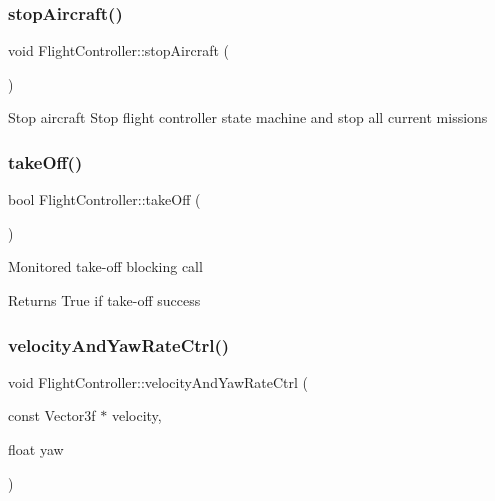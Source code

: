 \subsubsection{\texorpdfstring{stop\+Aircraft()}{stopAircraft()}}
{\footnotesize\ttfamily void Flight\+Controller\+::stop\+Aircraft (\begin{DoxyParamCaption}{ }\end{DoxyParamCaption})}

Stop aircraft Stop flight controller state machine and stop all current missions \mbox{\label{class_m210_1_1_flight_controller_a543d0eeef65856bf15675707cd8fc9c7}} 
\subsubsection{\texorpdfstring{take\+Off()}{takeOff()}}
{\footnotesize\ttfamily bool Flight\+Controller\+::take\+Off (\begin{DoxyParamCaption}{ }\end{DoxyParamCaption})}

Monitored take-\/off blocking call \begin{DoxyReturn}{Returns}
True if take-\/off success 
\end{DoxyReturn}
\mbox{\label{class_m210_1_1_flight_controller_a0f1d22f6099140194df9639e04e458bb}} 
\subsubsection{\texorpdfstring{velocity\+And\+Yaw\+Rate\+Ctrl()}{velocityAndYawRateCtrl()}}
{\footnotesize\ttfamily void Flight\+Controller\+::velocity\+And\+Yaw\+Rate\+Ctrl (\begin{DoxyParamCaption}\item[{const Vector3f $\ast$}]{velocity,  }\item[{float}]{yaw }\end{DoxyParamCaption})}

